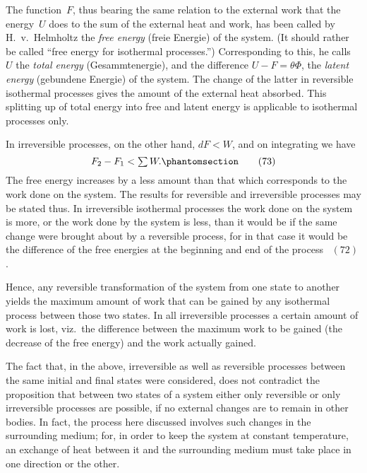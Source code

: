\documentclass[12pt]{book}[2005/09/16]
\newcommand{\Chg}[2]{#2}
\newcommand{\Add}[1]{\Chg{}{#1}}
\newcommand{\Tag}[1]{%
  \phantomsection\label{eqn:#1}\tag*{\ensuremath{#1}}%
}
\newcommand{\Eq}[1]{%
  \hyperref[eqn:#1]{\ensuremath{#1}}%
}
\newcommand{\PageSep}[1]{\ignorespaces}
\newcommand{\tsum}{\mathop{\textstyle\sum}\limits}
\begin{document}
The function~$F$, thus bearing the same relation to the
external work that the energy~$U$ does to the sum of the
%
%
%
%
external heat and work, has been called by H.~v.~Helmholtz
the \emph{free energy} (freie Energie) of the system. (It should
%
rather be called ``free energy for isothermal processes.'')
%
Corresponding to this, he calls~$U$ the \emph{total energy} (Gesammtenergie),
and the difference $U - F = \theta\Phi$, the \emph{latent energy}
%
(gebundene Energie) of the system. The change of the
latter in reversible isothermal processes gives the amount
of the external heat absorbed. This splitting up of total
energy into free and latent energy is applicable to isothermal
processes only.

In irreversible processes, on the other hand, $dF < W$,
and on integrating we have
\[
F_{2} - F_{1} < \tsum W\Add{.}
\Tag{(73)}
\]
\PageSep{111}
The free energy increases by a less amount than that which
corresponds to the work done on the system. The results
%
for reversible and irreversible processes may be stated thus.
In irreversible isothermal processes the work done on the
system is more, or the work done by the system is less, than
it would be if the same change were brought about by a
reversible process, for in that case it would be the difference
of the free energies at the beginning and end of the
process~\Eq{(72)}.

Hence, any reversible transformation of the system from
one state to another yields the maximum amount of work
that can be gained by any isothermal process between those
two states. In all irreversible processes a certain amount of
work is lost, viz.\ the difference between the maximum work
%
to be gained (the decrease of the free energy) and the work
actually gained.

The fact that, in the above, irreversible as well as
reversible processes between the same initial and final states
were considered, does not contradict the proposition that
between two states of a system either only reversible or
only irreversible processes are possible, if no external
changes are to remain in other bodies. In fact, the process
here discussed involves such changes in the surrounding
medium; for, in order to keep the system at constant
temperature, an exchange of heat between it and the surrounding
medium must take place in one direction or the
other.
\end{document}
